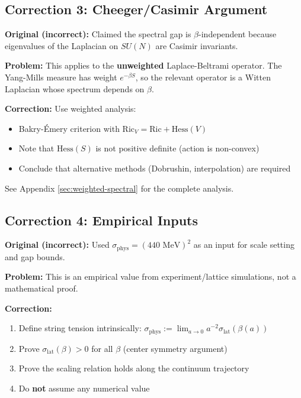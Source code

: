 \subsection{Correction 3: Cheeger/Casimir Argument}

\begin{correction}
\textbf{Original (incorrect):} Claimed the spectral gap is $\beta$-independent because eigenvalues of the Laplacian on $SU(N)$ are Casimir invariants.

\textbf{Problem:} This applies to the \textbf{unweighted} Laplace-Beltrami operator. The Yang-Mills measure has weight $e^{-\beta S}$, so the relevant operator is a Witten Laplacian whose spectrum depends on $\beta$.

\textbf{Correction:} Use weighted analysis:
\begin{itemize}
    \item Bakry-\'Emery criterion with $\mathrm{Ric}_V = \mathrm{Ric} + \mathrm{Hess}(V)$
    \item Note that $\mathrm{Hess}(S)$ is not positive definite (action is non-convex)
    \item Conclude that alternative methods (Dobrushin, interpolation) are required
\end{itemize}

See Appendix \ref{sec:weighted-spectral} for the complete analysis.
\end{correction}

\subsection{Correction 4: Empirical Inputs}

\begin{correction}
\textbf{Original (incorrect):} Used $\sigma_{\text{phys}} = (440 \text{ MeV})^2$ as an input for scale setting and gap bounds.

\textbf{Problem:} This is an empirical value from experiment/lattice simulations, not a mathematical proof.

\textbf{Correction:} 
\begin{enumerate}
    \item Define string tension intrinsically: $\sigma_{\text{phys}} := \lim_{a \to 0} a^{-2} \sigma_{\text{lat}}(\beta(a))$
    \item Prove $\sigma_{\text{lat}}(\beta) > 0$ for all $\beta$ (center symmetry argument)
    \item Prove the scaling relation holds along the continuum trajectory
    \item Do \textbf{not} assume any numerical value
\end{enumerate}
\end{correction}

